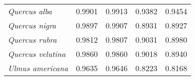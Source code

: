 \begin{table}[tb]
\begin{tabular}{lllll}
{\it Quercus alba}            & 0.9901          & 0.9913          & 0.9382         & 0.9454         \\
{\it Quercus nigra}           & 0.9897          & 0.9907          & 0.8931         & 0.8927         \\
{\it Quercus rubra}           & 0.9812          & 0.9807          & 0.9031         & 0.8980         \\
{\it Quercus velutina}        & 0.9860          & 0.9860          & 0.9018         & 0.8940         \\
{\it Ulmus americana}         & 0.9635          & 0.9646          & 0.8223         & 0.8168         \\
\bottomrule
\end{tabular}
\end{table}

